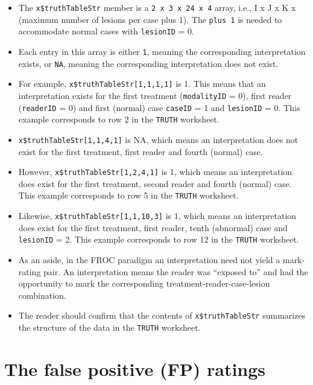 \documentclass[]{book}
\providecommand{\tightlist}{%
  \setlength{\itemsep}{0pt}\setlength{\parskip}{0pt}}
\begin{document}
\begin{itemize}
\tightlist
\item
  The \texttt{x\$truthTableStr} member is a \texttt{2\ x\ 3\ x\ 24\ x\ 4} array, i.e., I x J x K x (maximum number of lesions per case plus 1). The \texttt{plus\ 1} is needed to accommodate normal cases with \texttt{lesionID} = 0.
\item
  Each entry in this array is either \texttt{1}, meaning the corresponding interpretation exists, or \texttt{NA}, meaning the corresponding interpretation does not exist.
\item
  For example, \texttt{x\$truthTableStr{[}1,1,1,1{]}} is 1. This means that an interpretation exists for the first treatment (\texttt{modalityID} = 0), first reader (\texttt{readerID} = 0) and first (normal) case \texttt{caseID} = 1 and \texttt{lesionID} = 0. This example corresponds to row 2 in the \texttt{TRUTH} worksheet.
\item
  \texttt{x\$truthTableStr{[}1,1,4,1{]}} is NA, which means an interpretation does not exist for the first treatment, first reader and fourth (normal) case.
\item
  However, \texttt{x\$truthTableStr{[}1,2,4,1{]}} is 1, which means an interpretation does exist for the first treatment, second reader and fourth (normal) case. This example corresponds to row 5 in the \texttt{TRUTH} worksheet.
\item
  Likewise, \texttt{x\$truthTableStr{[}1,1,10,3{]}} is 1, which means an interpretation does exist for the first treatment, first reader, tenth (abnormal) case and \texttt{lesionID} = 2. This example corresponds to row 12 in the \texttt{TRUTH} worksheet.
\item
  As an aside, in the FROC paradigm an interpretation need not yield a mark-rating pair. An interpretation means the reader was ``exposed to'' and had the opportunity to mark the corresponding treatment-reader-case-lesion combination.
\item
  The reader should confirm that the contents of \texttt{x\$truthTableStr} summarizes the structure of the data in the \texttt{TRUTH} worksheet.
\end{itemize}

\hypertarget{the-false-positive-fp-ratings-3}{%
\section{The false positive (FP) ratings}\label{the-false-positive-fp-ratings-3}}
\end{document}
